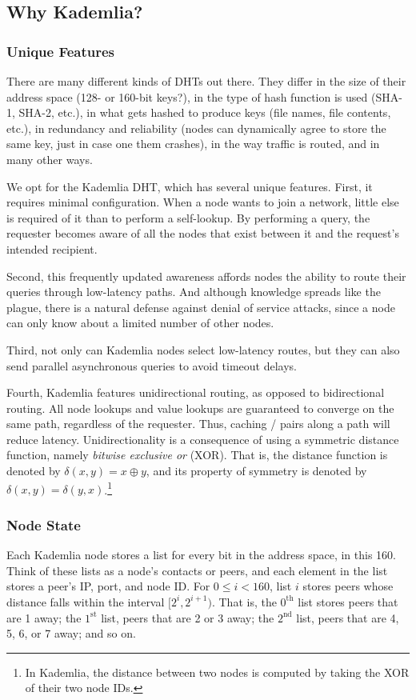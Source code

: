 \documentclass[12pt,twocolumn]{article}
\begin{document}
\subsection{Why Kademlia?}

\subsubsection{Unique Features}
There are many different kinds of DHTs out there. They differ in the size of their address space (128- or 160-bit keys?), in the type of hash function is used (SHA-1, SHA-2, etc.), in what gets hashed to produce keys (file names, file contents, etc.), in redundancy and reliability (nodes can dynamically agree to store the same key, just in case one them crashes), in the way traffic is routed, and in many other ways.

We opt for the Kademlia DHT, which has several unique features.
First, it requires minimal configuration.
When a node wants to join a network, little else is required of it than to perform a self-lookup.
By performing a query, the requester becomes aware of all the nodes that exist between it and the request's intended recipient.

Second, this frequently updated awareness affords nodes the ability to route their queries through low-latency paths.
And although knowledge spreads like the plague, there is a natural defense against denial of service attacks, since a node can only know about a limited number of other nodes.

Third, not only can Kademlia nodes select low-latency routes, but they can also send parallel asynchronous queries to avoid timeout delays.

Fourth, Kademlia features unidirectional routing, as opposed to bidirectional routing.
All node lookups and value lookups are guaranteed to converge on the same path, regardless of the requester.
Thus, caching \kv/ pairs along a path will reduce latency.
Unidirectionality is a consequence of using a symmetric distance function, namely \emph{bitwise exclusive or} (XOR).
That is, the distance function is denoted by $\delta(x,y) = x \oplus y$, and its property of symmetry is denoted by $\delta(x,y) = \delta(y,x)$.\footnote{In Kademlia, the distance between two nodes is computed by taking the XOR of their two node IDs.}

\subsubsection{Node State}
Each Kademlia node stores a list for every bit in the address space, in this 160.
Think of these lists as a node's contacts or peers, and each element in the list stores a peer's IP, port, and node ID.
For $0 \leq i < 160$, list $i$ stores peers whose distance falls within the interval $[2^i, 2^{i+1})$.
That is, the $0^{\mathrm{th}}$ list stores peers that are 1 away; the $1^{\mathrm{st}}$ list, peers that are 2 or 3 away; the $2^{\mathrm{nd}}$ list, peers that are 4, 5, 6, or 7 away; and so on.
\end{document}
